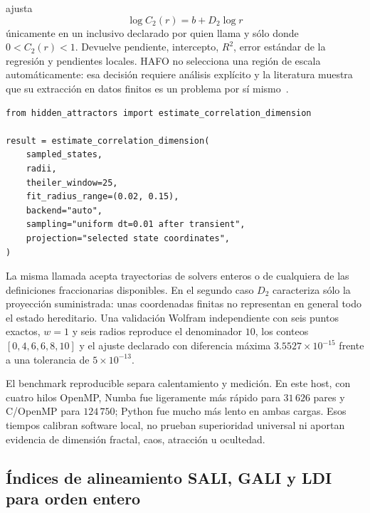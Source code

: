  ajusta
\[
 \log C_2(r)=b+D_2\log r
\]
únicamente en un  inclusivo declarado por quien
llama y sólo donde $0<C_2(r)<1$. Devuelve pendiente, intercepto, $R^2$,
error estándar de la regresión y pendientes locales. HAFO no selecciona una
región de escala automáticamente: esa decisión requiere análisis explícito y
la literatura muestra que su extracción en datos finitos es un problema por
sí mismo~\cite{DeshmukhEtAl2021}.

\begin{verbatim}
from hidden_attractors import estimate_correlation_dimension

result = estimate_correlation_dimension(
    sampled_states,
    radii,
    theiler_window=25,
    fit_radius_range=(0.02, 0.15),
    backend="auto",
    sampling="uniform dt=0.01 after transient",
    projection="selected state coordinates",
)
\end{verbatim}

La misma llamada acepta trayectorias de solvers enteros o de cualquiera de las
definiciones fraccionarias disponibles. En el segundo caso $D_2$ caracteriza
sólo la proyección suministrada: unas coordenadas finitas no representan en
general todo el estado hereditario. Una validación Wolfram independiente con
seis puntos exactos, $w=1$ y seis radios reproduce el denominador $10$, los
conteos $[0,4,6,6,8,10]$ y el ajuste declarado con diferencia máxima
$3.5527\times10^{-15}$ frente a una tolerancia de $5\times10^{-13}$.

El benchmark reproducible separa calentamiento y medición. En este host, con
cuatro hilos OpenMP, Numba fue ligeramente más rápido para $31\,626$ pares y
C/OpenMP para $124\,750$; Python fue mucho más lento en ambas cargas. Esos
tiempos calibran software local, no prueban superioridad universal ni aportan
evidencia de dimensión fractal, caos, atracción u ocultedad.

\subsection{Índices de alineamiento SALI, GALI y LDI para orden entero}
\label{sec:sali-gali-integer}

